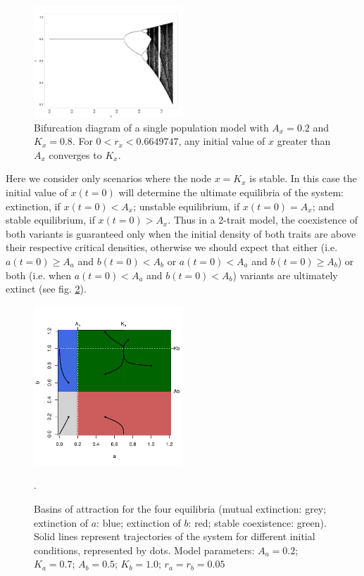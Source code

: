 \documentclass[3p,authoryear,twocolumn]{elsarticle} %
\begin{document}
\begin{figure}[h!]
  \centering
      \includegraphics[width=0.5\textwidth]{./figures/figure1.jpg}
  \caption{Bifurcation diagram of a single population model with $A_x=0.2$ and $K_x=0.8$. For $0<r_x<0.6649747$, any initial value of $x$ greater than $A_x$ converges to $K_x$.}
    \label{fig:bifurcationDiagram}
\end{figure}

Here we consider only scenarios where the node $x=K_x$ is stable. In this case the initial value of $x(t=0)$ will determine the ultimate equilibria of the system: extinction, if $x(t=0)<A_x$; unstable equilibrium, if $x(t=0)=A_x$; and stable equilibrium, if $x(t=0)>A_x$. Thus in a 2-trait model, the coexistence of both variants is guaranteed only when the initial density of both traits are above their respective critical densities, otherwise we should expect that either (i.e. $a(t=0) \geq A_a$ and $b(t=0)<A_b$ or $a(t=0)<A_a$ and $b(t=0) \geq A_b$) or both (i.e. when $a(t=0)<A_a$ and $b(t=0)<A_b$) variants are ultimately extinct (see fig. \ref{fig:NoTransmissionBasin}). 

\begin{figure}[h!]
  \centering
      \includegraphics[width=0.5\textwidth]{./figures/figure2.pdf}
  \caption{Basins of attraction for the four equilibria (mutual extinction: grey; extinction of $a$: blue; extinction of $b$: red; stable coexistence: green). Solid lines represent trajectories of the system for different initial conditions, represented by dots. Model parameters: $A_a=0.2$; $K_a=0.7$; $A_b=0.5$; $K_b=1.0$; $r_a=r_b=0.05$}.
    \label{fig:NoTransmissionBasin}
\end{figure}
\end{document}
